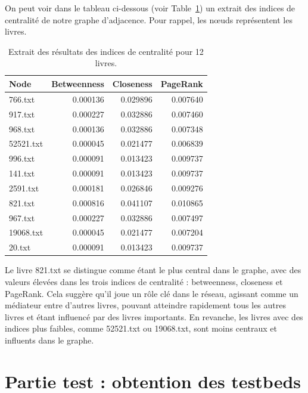 \documentclass{article}
\begin{document}
    On peut voir dans le tableau ci-dessous (voir Table~\ref{tab:centrality}) un extrait des indices de centralité de notre graphe d’adjacence. Pour rappel, les nœuds représentent les livres.    
    \begin{table}[H] %
        \centering
        \begin{tabular}{lrrr}
            \toprule
            Node & Betweenness & Closeness & PageRank \\
            \midrule
            766.txt & 0.000136 & 0.029896 & 0.007640 \\
            917.txt & 0.000227 & 0.032886 & 0.007460 \\
            968.txt & 0.000136 & 0.032886 & 0.007348 \\
            52521.txt & 0.000045 & 0.021477 & 0.006839 \\
            996.txt & 0.000091 & 0.013423 & 0.009737 \\
            141.txt & 0.000091 & 0.013423 & 0.009737 \\
            2591.txt & 0.000181 & 0.026846 & 0.009276 \\
            821.txt & 0.000816 & 0.041107 & 0.010865 \\
            967.txt & 0.000227 & 0.032886 & 0.007497 \\
            19068.txt & 0.000045 & 0.021477 & 0.007204 \\
            20.txt & 0.000091 & 0.013423 & 0.009737 \\
            \bottomrule
        \end{tabular}
        \caption{Extrait des résultats des indices de centralité pour 12 livres.}
        \cite{tableauCentralite}
        \label{tab:centrality} %
    \end{table}
    Le livre 821.txt se distingue comme étant le plus central dans le graphe, avec des valeurs élevées dans les trois indices de centralité : betweenness, closeness et PageRank. Cela suggère qu’il joue un rôle clé dans le réseau, agissant comme un médiateur entre d’autres livres, pouvant atteindre rapidement tous les autres livres et étant influencé par des livres importants. En revanche, les livres avec des indices plus faibles, comme 52521.txt ou 19068.txt, sont moins centraux et influents dans le graphe.
\section{Partie test : obtention des testbeds}
\end{document}
